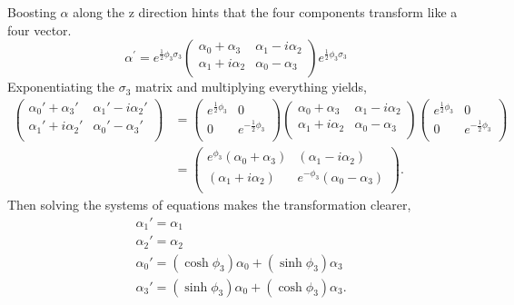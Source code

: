 Boosting $\alpha$ along the z direction hints that the four components transform like a four vector.  
\begin{equation}
\alpha^{'} = e^{\frac{1}{2}\phi_3 \sigma_3} 
\begin{pmatrix}
\alpha_0 + \alpha_3 & \alpha_1 - i\alpha_2 \\
\alpha_1 + i\alpha_2 & \alpha_0 - \alpha_3 \\
\end{pmatrix}
e^{\frac{1}{2}\phi_3 \sigma_3}
\end{equation}
Exponentiating the $\sigma_3$ matrix and multiplying everything yields,
\begin{equation}
\begin{split}
\begin{pmatrix}
\alpha_0' + \alpha_3' & \alpha_1' - i\alpha_2' \\
\alpha_1' + i\alpha_2' & \alpha_0' - \alpha_3' \\
\end{pmatrix}
&=
\begin{pmatrix}
e^{\frac{1}{2}\phi_3} & 0 \\
0 & e^{-\frac{1}{2}\phi_3} \\
\end{pmatrix}
\begin{pmatrix}
\alpha_0 + \alpha_3 & \alpha_1 - i\alpha_2 \\
\alpha_1 + i\alpha_2 & \alpha_0 - \alpha_3 \\
\end{pmatrix}
\begin{pmatrix}
e^{\frac{1}{2}\phi_3} & 0 \\
0 & e^{-\frac{1}{2}\phi_3} \\
\end{pmatrix} \\
&=
\begin{pmatrix}
e^{\phi_3}(\alpha_0 + \alpha_3) & (\alpha_1 - i\alpha_2) \\
(\alpha_1 + i\alpha_2) & e^{-\phi_3}(\alpha_0 - \alpha_3) \\
\end{pmatrix}.
\end{split}
\end{equation}
Then solving the systems of equations makes the transformation clearer,
\begin{equation}
\begin{split}
&\alpha_1' = \alpha_1 \\
&\alpha_2' = \alpha_2 \\
&\alpha_0' = (\cosh\phi_3) \alpha_0 +  (\sinh\phi_3) \alpha_3 \\ 
&\alpha_3' = (\sinh\phi_3) \alpha_0 +  (\cosh\phi_3) \alpha_3. \\ 
\end{split}
\end{equation}
